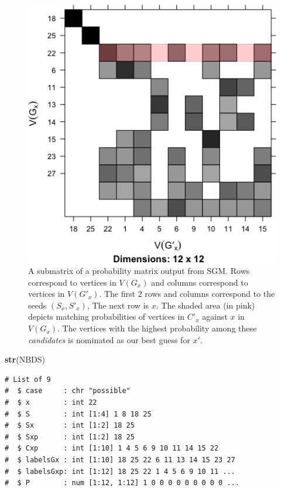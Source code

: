 \documentclass[]{article}
\newenvironment{Shaded}{\begin{snugshade}}{\end{snugshade}}
\newcommand{\KeywordTok}[1]{\textcolor[rgb]{0.13,0.29,0.53}{\textbf{#1}}}
\newcommand{\NormalTok}[1]{#1}
\begin{document}
\begin{figure}
\centering
\includegraphics{vn_files/figure-latex/sgm-1.png}
\caption{A submatrix of a probability matrix output from SGM. Rows
correspond to vertices in \(V(G_x)\) and columns correspond to vertices
in \(V(G'_x)\). The first 2 rows and columns correspond to the seeds
\((S_x,S'_x)\), The next row is \(x\). The shaded area (in pink) depicts
matching probabilities of vertices in \(C'_x\) against \(x\) in
\(V(G_x)\). The vertices with the highest probability among these
\emph{candidates} is nominated as our best guess for \(x'\).}
\end{figure}

\begin{Shaded}
\begin{Highlighting}[]
\KeywordTok{str}\NormalTok{(NBDS)}
\end{Highlighting}
\end{Shaded}

\begin{verbatim}
# List of 9
#  $ case     : chr "possible"
#  $ x        : int 22
#  $ S        : int [1:4] 1 8 18 25
#  $ Sx       : int [1:2] 18 25
#  $ Sxp      : int [1:2] 18 25
#  $ Cxp      : int [1:10] 1 4 5 6 9 10 11 14 15 22
#  $ labelsGx : int [1:10] 18 25 22 6 11 13 14 15 23 27
#  $ labelsGxp: int [1:12] 18 25 22 1 4 5 6 9 10 11 ...
#  $ P        : num [1:12, 1:12] 1 0 0 0 0 0 0 0 0 0 ...
\end{verbatim}
\end{document}
